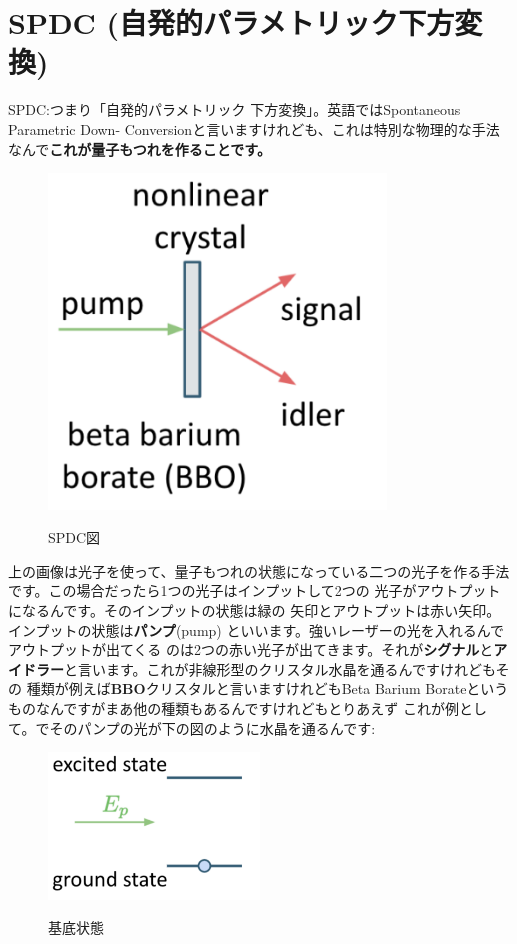 \section{SPDC (自発的パラメトリック下方変換)}
SPDC:つまり「自発的パラメトリック
下方変換」。英語ではSpontaneous Parametric Down-
Conversionと言いますけれども、これは特別な物理的な手法なんで\textbf{これが量子もつれを作ることです。}
\begin{figure}[H]
    \centering
    \includegraphics[width=0.8\textwidth]{lesson4/pump.pdf}
    \label{fig: 1}
    \begin{center}
        \caption{SPDC図}
    \end{center}
\end{figure}
上の画像は光子を使って、量子もつれの状態になっている二つの光子を作る手法です。この場合だったら1つの光子はインプットして2つの
光子がアウトプットになるんです。そのインプットの状態は緑の
矢印とアウトプットは赤い矢印。インプットの状態は\textbf{パンプ}(pump)
といいます。強いレーザーの光を入れるんでアウトプットが出てくる
のは2つの赤い光子が出てきます。それが\textbf{シグナル}と\textbf{アイドラー}と言います。これが非線形型のクリスタル水晶を通るんですけれどもその
種類が例えば\textbf{BBO}クリスタルと言いますけれどもBeta Barium Borateというものなんですがまあ他の種類もあるんですけれどもとりあえず
これが例として。でそのパンプの光が下の図のように水晶を通るんです:
\begin{figure}[H]
    \centering
    \includegraphics[width=0.5\textwidth]{lesson4/state1.pdf}
    \label{fig: 1}
    \begin{center}
        \caption{基底状態}
    \end{center}
\end{figure}
